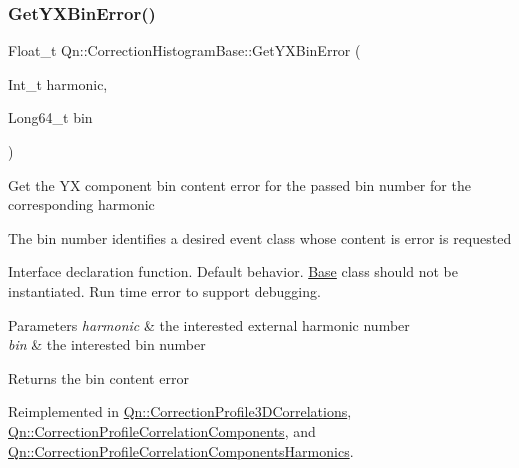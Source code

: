 \mbox{\label{classQn_1_1CorrectionHistogramBase_a2dc192026e8bb323cb7a93c5d36584bf}} 
\subsubsection{\texorpdfstring{Get\+Y\+X\+Bin\+Error()}{GetYXBinError()}\hspace{0.1cm}{\footnotesize\ttfamily [2/2]}}
{\footnotesize\ttfamily Float\+\_\+t Qn\+::\+Correction\+Histogram\+Base\+::\+Get\+Y\+X\+Bin\+Error (\begin{DoxyParamCaption}\item[{Int\+\_\+t}]{harmonic,  }\item[{Long64\+\_\+t}]{bin }\end{DoxyParamCaption})\hspace{0.3cm}{\ttfamily [virtual]}}

Get the YX component bin content error for the passed bin number for the corresponding harmonic

The bin number identifies a desired event class whose content is error is requested

Interface declaration function. Default behavior. \mbox{\hyperlink{classBase}{Base}} class should not be instantiated. Run time error to support debugging.


\begin{DoxyParams}{Parameters}
{\em harmonic} & the interested external harmonic number \\
\hline
{\em bin} & the interested bin number \\
\hline
\end{DoxyParams}
\begin{DoxyReturn}{Returns}
the bin content error 
\end{DoxyReturn}


Reimplemented in \mbox{\hyperlink{classQn_1_1CorrectionProfile3DCorrelations_a3f6a74c4e11f5cf25e9e790f8bda20ba}{Qn\+::\+Correction\+Profile3\+D\+Correlations}}, \mbox{\hyperlink{classQn_1_1CorrectionProfileCorrelationComponents_aa5af19d9bf922e6be18b0f5a651a8c45}{Qn\+::\+Correction\+Profile\+Correlation\+Components}}, and \mbox{\hyperlink{classQn_1_1CorrectionProfileCorrelationComponentsHarmonics_a27ddadf86598339c7cc6bbdc8f5475fe}{Qn\+::\+Correction\+Profile\+Correlation\+Components\+Harmonics}}.

